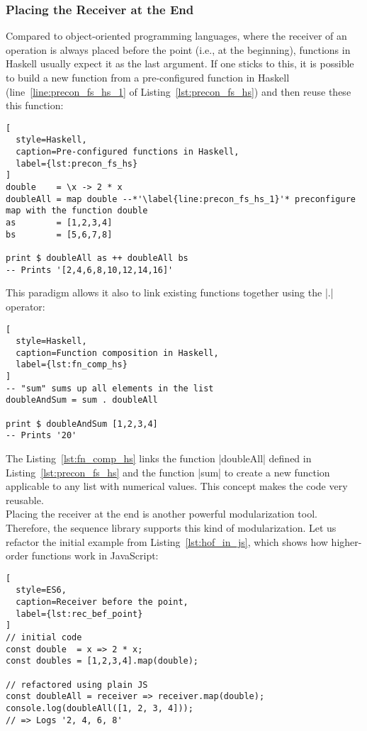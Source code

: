 \subsubsection{Placing the Receiver at the End} %
\label{subsub:Placing the Receiver at the End}
Compared to object-oriented programming languages, where the receiver of an
operation is always placed before the point (i.e., at the beginning), functions
in Haskell usually expect it as the last argument. If one sticks to this, it is
possible to build a new function from a pre-configured function in Haskell
(line~\ref{line:precon_fs_hs_1} of Listing~\ref{lst:precon_fs_hs}) and then
reuse these this function:

\begin{lstlisting}[
  style=Haskell,
  caption=Pre-configured functions in Haskell,
  label={lst:precon_fs_hs}
]
double    = \x -> 2 * x
doubleAll = map double --*'\label{line:precon_fs_hs_1}'* preconfigure map with the function double
as        = [1,2,3,4]
bs        = [5,6,7,8]

print $ doubleAll as ++ doubleAll bs
-- Prints '[2,4,6,8,10,12,14,16]'
\end{lstlisting}

This paradigm allows it also to link existing functions together using the |.|
operator:

\begin{lstlisting}[
  style=Haskell,
  caption=Function composition in Haskell,
  label={lst:fn_comp_hs}
]
-- "sum" sums up all elements in the list
doubleAndSum = sum . doubleAll

print $ doubleAndSum [1,2,3,4]
-- Prints '20'
\end{lstlisting}

The Listing~\ref{lst:fn_comp_hs} links the function |doubleAll| defined in
Listing~\ref{lst:precon_fs_hs} and the function |sum| to create a new function
applicable to any list with numerical values. This concept makes the code very
reusable.\\
Placing the receiver at the end is another powerful modularization
tool. Therefore, the sequence library supports this kind of modularization.
Let us refactor the initial example from Listing~\ref{lst:hof_in_js}, which 
shows how higher-order functions work in JavaScript:
\begin{lstlisting}[
  style=ES6,
  caption=Receiver before the point,
  label={lst:rec_bef_point}
]
// initial code
const double  = x => 2 * x;
const doubles = [1,2,3,4].map(double);

// refactored using plain JS
const doubleAll = receiver => receiver.map(double);
console.log(doubleAll([1, 2, 3, 4]));
// => Logs '2, 4, 6, 8'
\end{lstlisting}

